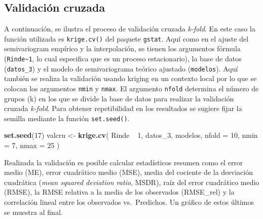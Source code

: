 \documentclass[11pt,b5paper,]{krantz}
\newenvironment{Shaded}{}{}
\newcommand{\KeywordTok}[1]{\textcolor[rgb]{0.00,0.44,0.13}{\textbf{#1}}}
\newcommand{\DataTypeTok}[1]{\textcolor[rgb]{0.56,0.13,0.00}{#1}}
\newcommand{\DecValTok}[1]{\textcolor[rgb]{0.25,0.63,0.44}{#1}}
\newcommand{\StringTok}[1]{\textcolor[rgb]{0.25,0.44,0.63}{#1}}
\newcommand{\OperatorTok}[1]{\textcolor[rgb]{0.40,0.40,0.40}{#1}}
\newcommand{\NormalTok}[1]{#1}
\begin{document}
\subsection{Validación cruzada}\label{validaciuxf3n-cruzada-1}

A continuación, se ilustra el proceso de validación cruzada
\emph{k-fold}. En este caso la función utilizada es \texttt{krige.cv()}
del paquete \texttt{gstat}. Aquí como en el ajuste del semivariogram
empírico y la interpolación, se tienen los argumentos fórmula
(\texttt{Rinde\textasciitilde{}1}, lo cual especifica que es un proceso
estacionario), la base de datos (\texttt{datos\_3}) y el modelo de
semivariograma teórico ajustado (\texttt{modelos}). Aquí también se
realiza la validación usando kriging en un contexto local por lo que se
colocan los argumentos \texttt{nmin} y \texttt{nmax}. El argumento
\texttt{nfold} determina el número de grupos (k) en los que se divide la
base de datos para realizar la validación cruzada \emph{k-fold}. Para
obtener repetibilidad en los resultados se sugiere fijar la semilla
mediante la función \texttt{set.seed()}.

\begin{Shaded}
\begin{Highlighting}[]
\KeywordTok{set.seed}\NormalTok{(}\DecValTok{17}\NormalTok{)}
\NormalTok{valcru <-}
\StringTok{  }\KeywordTok{krige.cv}\NormalTok{(}
\NormalTok{    Rinde }\OperatorTok{~}\StringTok{ }\DecValTok{1}\NormalTok{,}
\NormalTok{    datos_}\DecValTok{3}\NormalTok{,}
\NormalTok{    modelos,}
    \DataTypeTok{nfold =} \DecValTok{10}\NormalTok{,}
    \DataTypeTok{nmin =} \DecValTok{7}\NormalTok{,}
    \DataTypeTok{nmax =} \DecValTok{25}
\NormalTok{  )}
\end{Highlighting}
\end{Shaded}

Realizada la validación es posible calcular estadísticos resumen como el
error medio (ME), error cuadrático medio (MSE), media del cociente de la
desviación cuadrática (\emph{mean squared deviation ratio}, MSDR), raíz
del error cuadrático medio (RMSE), la RMSE relativa a la media de los
observados (RMSE\_rel) y la correlación lineal entre los observados
vs.~Predichos. Un gráfico de estos últimos se muestra al final.
\end{document}
